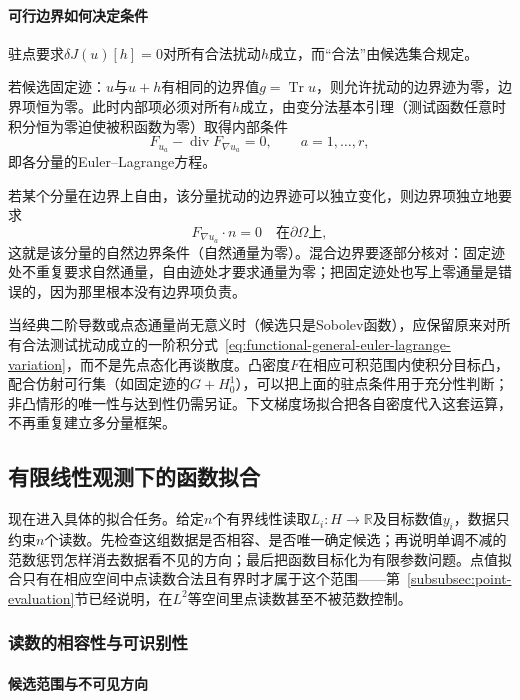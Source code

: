\paragraph{可行边界如何决定条件}

驻点要求$\delta J(u)[h]=0$对所有合法扰动$h$成立，而“合法”由候选集合规定。

若候选固定迹：$u$与$u+h$有相同的边界值$g=\operatorname{Tr}u$，则允许扰动的边界迹为零，边界项恒为零。此时内部项必须对所有$h$成立，由变分法基本引理（测试函数任意时积分恒为零迫使被积函数为零）取得内部条件
\[
  F_{u_a}-\operatorname{div}F_{\nabla u_a}=0,\qquad a=1,\ldots,r,
\]
即各分量的Euler--Lagrange方程。

若某个分量在边界上自由，该分量扰动的边界迹可以独立变化，则边界项独立地要求
\[
  F_{\nabla u_a}\cdot n=0\quad\text{在$\partial\Omega$上},
\]
这就是该分量的自然边界条件（自然通量为零）。混合边界要逐部分核对：固定迹处不重复要求自然通量，自由迹处才要求通量为零；把固定迹处也写上零通量是错误的，因为那里根本没有边界项负责。

当经典二阶导数或点态通量尚无意义时（候选只是Sobolev函数），应保留原来对所有合法测试扰动成立的一阶积分式~\eqref{eq:functional-general-euler-lagrange-variation}，而不是先点态化再谈散度。凸密度$F$在相应可积范围内使积分目标凸，配合仿射可行集（如固定迹的$G+H_0^1$），可以把上面的驻点条件用于充分性判断；非凸情形的唯一性与达到性仍需另证。下文梯度场拟合把各自密度代入这套运算，不再重复建立多分量框架。

\subsection{有限线性观测下的函数拟合}
\label{subsubsec:finite-observation-fitting}

现在进入具体的拟合任务。给定$n$个有界线性读取$L_i:H\to\mathbb R$及目标数值$y_i$，数据只约束$n$个读数。先检查这组数据是否相容、是否唯一确定候选；再说明单调不减的范数惩罚怎样消去数据看不见的方向；最后把函数目标化为有限参数问题。点值拟合只有在相应空间中点读数合法且有界时才属于这个范围——第~\ref{subsubsec:point-evaluation}节已经说明，在$L^2$等空间里点读数甚至不被范数控制。

\subsubsection{读数的相容性与可识别性}
\label{subsubsec:identifiability}

\paragraph{候选范围与不可见方向}

